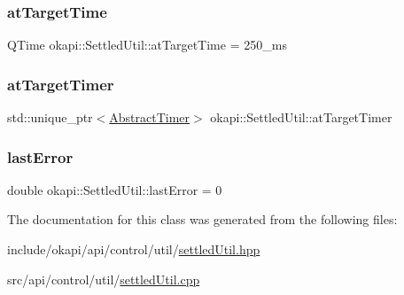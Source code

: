 \subsubsection{\texorpdfstring{atTargetTime}{atTargetTime}}
{\footnotesize\ttfamily Q\+Time okapi\+::\+Settled\+Util\+::at\+Target\+Time = 250\+\_\+ms\hspace{0.3cm}{\ttfamily [protected]}}

\mbox{\label{classokapi_1_1SettledUtil_aebaa16b34b04ee6c7938418f83d47e56}} 
\subsubsection{\texorpdfstring{atTargetTimer}{atTargetTimer}}
{\footnotesize\ttfamily std\+::unique\+\_\+ptr$<$\mbox{\hyperlink{classokapi_1_1AbstractTimer}{Abstract\+Timer}}$>$ okapi\+::\+Settled\+Util\+::at\+Target\+Timer\hspace{0.3cm}{\ttfamily [protected]}}

\mbox{\label{classokapi_1_1SettledUtil_ac1316106ec5932cc9f6de5cd83d3e155}} 
\subsubsection{\texorpdfstring{lastError}{lastError}}
{\footnotesize\ttfamily double okapi\+::\+Settled\+Util\+::last\+Error = 0\hspace{0.3cm}{\ttfamily [protected]}}



The documentation for this class was generated from the following files\+:\begin{DoxyCompactItemize}
\item 
include/okapi/api/control/util/\mbox{\hyperlink{settledUtil_8hpp}{settled\+Util.\+hpp}}\item 
src/api/control/util/\mbox{\hyperlink{settledUtil_8cpp}{settled\+Util.\+cpp}}\end{DoxyCompactItemize}
